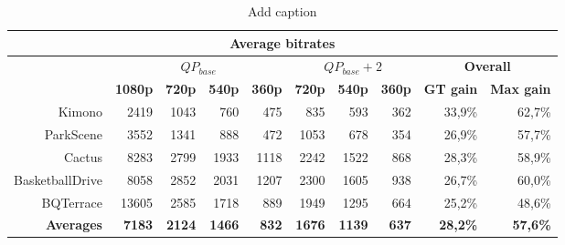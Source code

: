 \begin{table}[htbp]
  \centering
  \caption{Add caption}
    \begin{tabular}{r|rrrr|rrr|rr}
    \toprule
    \multicolumn{10}{c}{\textbf{Average bitrates}} \\
    \midrule
       & \multicolumn{4}{c|}{\textbf{$QP_{base}$}} & \multicolumn{3}{c|}{\textbf{$QP_{base}+2$}} & \multicolumn{2}{c}{\textbf{Overall}} \\
       & \textbf{1080p} & \textbf{720p} & \textbf{540p} & \textbf{360p} & \textbf{720p} & \textbf{540p} & \textbf{360p} & \textbf{GT gain} & \textbf{Max gain} \\
    Kimono & 2419 & 1043 & 760 & 475 & 835 & 593 & 362 & 33,9\% & 62,7\% \\
    ParkScene & 3552 & 1341 & 888 & 472 & 1053 & 678 & 354 & 26,9\% & 57,7\% \\
    Cactus & 8283 & 2799 & 1933 & 1118 & 2242 & 1522 & 868 & 28,3\% & 58,9\% \\
    BasketballDrive & 8058 & 2852 & 2031 & 1207 & 2300 & 1605 & 938 & 26,7\% & 60,0\% \\
    BQTerrace & 13605 & 2585 & 1718 & 889 & 1949 & 1295 & 664 & 25,2\% & 48,6\% \\
    \textbf{Averages} & \textbf{7183} & \textbf{2124} & \textbf{1466} & \textbf{832} & \textbf{1676} & \textbf{1139} & \textbf{637} & \textbf{28,2\%} & \textbf{57,6\%} \\
    \bottomrule
    \end{tabular}%
  \label{tab:addlabel}%
\end{table}%
